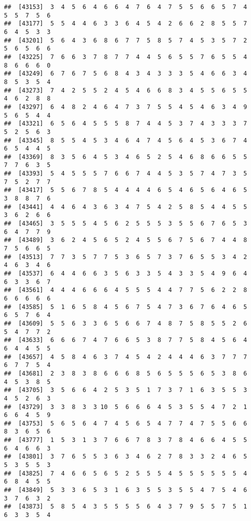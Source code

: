 \documentclass[
]{book}
\begin{document}
\begin{verbatim}
##  [43153]  3  4  5  6  4  6  6  4  7  6  4  7  5  5  6  6  5  7  4  5  5  7  5  6
##  [43177]  5  5  4  4  6  3  3  6  4  5  4  2  6  6  2  8  5  5  7  6  4  5  3  3
##  [43201]  5  6  4  3  6  8  6  7  7  5  8  5  7  4  5  3  5  7  2  5  6  5  6  6
##  [43225]  7  6  6  3  7  8  7  7  4  4  5  6  5  5  7  6  5  5  4  8  6  6  6  0
##  [43249]  6  7  6  7  5  6  8  4  3  4  3  3  3  5  4  6  6  3  4  8  5  3  5  4
##  [43273]  7  4  2  5  5  2  4  5  4  6  6  8  3  4  5  5  6  5  5  4  6  2  8  8
##  [43297]  6  4  8  2  4  6  4  7  3  7  5  5  4  5  4  6  3  4  9  5  6  5  4  4
##  [43321]  6  5  6  4  5  5  5  8  7  4  4  5  3  7  4  3  3  3  7  5  2  5  6  3
##  [43345]  8  5  5  4  5  3  4  6  4  7  4  5  6  4  5  3  6  7  4  6  5  4  4  5
##  [43369]  8  3  5  6  4  5  3  4  6  5  2  5  4  6  8  6  6  5  5  7  7  6  3  5
##  [43393]  5  4  5  5  5  7  6  6  7  4  4  5  3  5  7  4  7  3  5  7  5  2  7  7
##  [43417]  5  5  6  7  8  5  4  4  4  4  6  5  4  6  5  6  4  6  5  3  8  8  7  6
##  [43441]  4  4  6  4  3  6  3  4  7  5  4  2  5  8  5  4  4  5  5  3  6  2  6  6
##  [43465]  3  5  5  5  4  5  6  2  5  5  5  3  5  5  6  7  6  5  3  6  4  7  7  9
##  [43489]  3  6  2  4  5  6  5  2  4  5  5  6  7  5  6  7  4  4  8  7  5  6  6  5
##  [43513]  7  7  3  5  7  7  5  3  6  5  7  3  7  6  5  5  3  4  2  4  6  3  4  6
##  [43537]  6  4  4  6  6  3  5  6  3  3  5  4  3  3  5  4  9  6  4  6  3  3  6  7
##  [43561]  4  4  4  6  6  6  4  5  5  5  4  4  7  7  5  6  2  2  8  6  6  6  6  6
##  [43585]  5  1  6  5  8  4  5  6  7  5  4  7  3  6  7  6  4  6  5  6  5  7  6  4
##  [43609]  5  5  6  3  3  6  5  6  6  7  4  8  7  5  8  5  5  2  6  5  4  7  7  2
##  [43633]  6  6  6  7  4  7  6  6  5  3  8  7  7  5  8  4  5  6  4  6  4  4  5  5
##  [43657]  4  5  8  4  6  3  7  4  5  4  2  4  4  4  6  3  7  7  7  6  7  7  5  4
##  [43681]  2  3  8  3  8  6  6  6  8  5  6  5  5  5  6  5  3  8  6  4  5  3  8  5
##  [43705]  3  5  6  6  4  2  5  3  5  1  7  3  7  1  6  3  5  5  3  4  5  2  6  3
##  [43729]  3  3  8  3  3 10  5  6  6  6  4  5  3  5  5  4  7  2  1  6  6  4  5  9
##  [43753]  5  6  5  6  4  7  4  5  6  5  4  7  7  4  7  5  5  6  6  8  3  6  5  6
##  [43777]  1  5  3  1  3  7  6  6  7  8  3  7  8  4  6  6  4  5  5  6  4  6  6  3
##  [43801]  3  7  6  5  5  3  6  3  4  6  2  7  8  3  3  2  4  6  5  5  3  5  5  3
##  [43825]  7  4  6  6  5  6  5  2  5  5  5  4  5  5  5  5  5  5  4  6  8  4  5  5
##  [43849]  5  3  3  6  5  3  1  6  3  5  5  3  5  5  4  7  5  4  6  3  7  6  3  2
##  [43873]  5  8  5  4  3  5  5  5  5  6  4  3  7  9  5  5  7  5  1  6  3  3  5  4

\end{verbatim}
\end{document}

